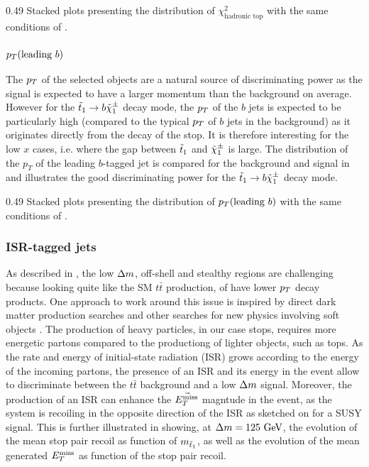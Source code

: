                  {0.49}
                 {Stacked plots presenting the distribution of $\chi^2_\text{hadronic top}$
                 with the same conditions of .}

    \subsubsection{$p_T(\text{leading } b)$}

    The $p_T$ of the selected objects are a natural source of discriminating power as
    the signal is expected to have a larger momentum than the background on average.
    However for the $\tilde{t}_1 \rightarrow b \tilde{\chi}_1^\pm$ decay mode, the $p_T$ of the
    $b$ jets is expected to be particularly high (compared to the typical $p_T$ of $b$ jets in the
    background) as it originates directly from the decay of the stop. It is therefore
    interesting for the low $x$ cases, i.e. where the gap between $\tilde{t}_1$ and
    $\tilde{\chi}_1^\pm$ is large. The distribution of the $p_T$ of the leading
    $b$-tagged jet is compared for the background and signal in 
    and illustrates the good discriminating power for the $\tilde{t}_1 \rightarrow b \tilde{\chi}_1^\pm$
    decay mode.

                 {0.49}
                 {Stacked plots presenting the distribution of $p_T(\text{leading } b)$
                 with the same conditions of .}

    \subsubsection{ISR-tagged jets}

    As described in , the low $\Delta m$,
    off-shell and stealthy regions are challenging because looking quite like the SM
    $t\bar{t}$ production, of have lower $p_T$ decay products. One approach to
    work around this issue is inspired by direct dark matter production searches \cite{EXOmonojet}
    and other searches for new physics involving soft objects \cite{SUScompressedStop}. The
    production of heavy particles, in our case stops, requires more energetic
    partons compared to the productiong of lighter objects, such as tops. As the rate and energy of
    initial-state radiation (ISR) grows according to the energy of the incoming partons,
    the presence of an ISR and its energy in the event allow to discriminate between the $t\bar{t}$
    background and a low $\Delta m$ signal. Moreover, the production of an ISR can enhance
    the $\vec{E_T^\text{miss}}$ magntude in the event, as the system is recoiling in the opposite
    direction of the ISR as sketched on  for a
    SUSY signal. This is further illustrated in  showing, at
    $\Delta m = 125~\text{GeV}$, the evolution of the mean stop pair recoil as function
    of $m_{\tilde{t}_1}$, as well as the evolution of the mean generated $E_T^\text{miss}$ as function
    of the stop pair recoil.

